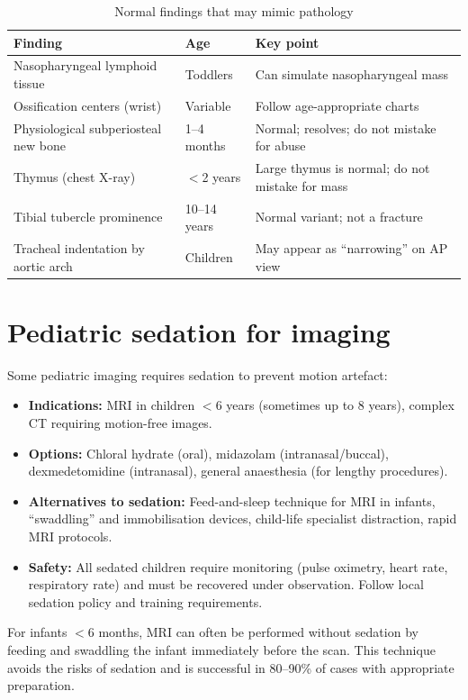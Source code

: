 \begin{table}[h]
\centering
\caption{Normal findings that may mimic pathology}
\label{tab:paediatric_normals}
\begin{tabular}{@{}p{}p{}p{}@{}}
\hline
\textbf{Finding} & \textbf{Age} & \textbf{Key point} \\
\hline
Nasopharyngeal lymphoid tissue & Toddlers & Can simulate nasopharyngeal mass \\
Ossification centers (wrist) & Variable & Follow age-appropriate charts \\
Physiological subperiosteal new bone & 1--4 months & Normal; resolves; do not mistake for abuse \\
Thymus (chest X-ray) & $<$2 years & Large thymus is normal; do not mistake for mass \\
Tibial tubercle prominence & 10--14 years & Normal variant; not a fracture \\
Tracheal indentation by aortic arch & Children & May appear as ``narrowing'' on AP view \\
\hline
\end{tabular}
\end{table}

\section{Pediatric sedation for imaging}
Some pediatric imaging requires sedation to prevent motion artefact:
\begin{itemize}
    \item \textbf{Indications:} MRI in children $<$6 years (sometimes up to 8 years), complex CT requiring motion-free images.
    \item \textbf{Options:} Chloral hydrate (oral), midazolam (intranasal/buccal), dexmedetomidine (intranasal), general anaesthesia (for lengthy procedures).
    \item \textbf{Alternatives to sedation:} Feed-and-sleep technique for MRI in infants, ``swaddling'' and immobilisation devices, child-life specialist distraction, rapid MRI protocols.
    \item \textbf{Safety:} All sedated children require monitoring (pulse oximetry, heart rate, respiratory rate) and must be recovered under observation. Follow local sedation policy and training requirements.
\end{itemize}

\begin{pearlbox}
For infants $<$6 months, MRI can often be performed without sedation by feeding and swaddling the infant immediately before the scan. This technique avoids the risks of sedation and is successful in 80--90\% of cases with appropriate preparation.
\end{pearlbox}

